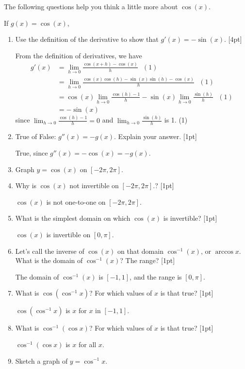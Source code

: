 \documentclass[12pt,twoside]{article}
\begin{document}
The following questions help you think a little more about $\cos(x)$. 

If $g(x) = \cos(x)$, 
\begin{enumerate}
      \item Use the definition of the derivative to show that $g'(x) = -\sin(x)$. [4pt]
      
      From the definition of derivatives, we have 
      \begin{align*}
      g'(x) &= \lim_{h \rightarrow 0} \frac{\cos(x+h) - \cos(x)}{h}  ~~~(1) \\
      & = \lim_{h \rightarrow 0} \frac{ \cos(x)\cos(h) - \sin(x) \sin(h) - \cos(x)}{h} ~~~(1)  \\
      & = \cos(x)  \lim_{h \rightarrow 0} \frac{\cos(h) -1}{h} - \sin(x)  \lim_{h \rightarrow 0} \frac{\sin(h)}{h} ~~~(1) \\
      & = -\sin(x)
      \end{align*}
      since $\lim_{h \rightarrow 0} \frac{\cos(h) -1}{h} = 0 $ and $\lim_{h \rightarrow 0} \frac{\sin(h)}{h}$ is 1. (1)
      
      \item True of False: $g''(x) = -g(x)$. Explain your answer. [1pt]
     
      True, since $g''(x) = -\cos(x) = -g(x)$. 
      
      \item Graph $y = \cos(x)$ on $[-2\pi, 2\pi]$. 
      
      \item Why is $\cos(x)$ not invertible on $[-2\pi, 2\pi]$.? [1pt]
     
      $\cos(x)$ is not one-to-one on $[-2\pi, 2\pi]$. 
      
      \item What is the simplest domain on which $\cos(x)$ is invertible? [1pt]
      
      $\cos(x)$ is invertible on $[0, \pi]$. 
      
      \item Let's call the inverse of $\cos(x)$ on that domain $\cos^{-1}(x)$, or $\arccos x$. What is the domain of $\cos^{-1}(x)$? The range? [1pt]
      
      The domain of $\cos^{-1}(x)$ is $[-1, 1]$, and the range is $[0, \pi]$.
    
      \item What is $\cos(\cos^{-1} x)$? For which values of $x$ is that true? [1pt]
      
      $\cos(\cos^{-1} x)$ is $x$ for $x$ in $[-1, 1]$.
      
      \item What is $\cos^{-1} (\cos x)$? For which values of $x$ is that true? [1pt]
      
      $\cos^{-1} (\cos x)$ is $x$ for all $x$.
      
      \item Sketch a graph of $y = \cos^{-1} x$. 
\end{enumerate}
\end{document}

